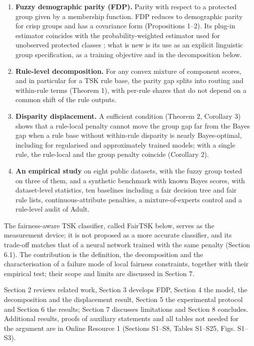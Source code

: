\documentclass[pdflatex,sn-basic,Numbered,lineno]{sn-jnl}
\providecommand{\tightlist}{\setlength{\itemsep}{0pt}\setlength{\parskip}{0pt}}
\begin{document}
\begin{enumerate}
\def\labelenumi{\arabic{enumi}.}
\tightlist
\item
  \textbf{Fuzzy demographic parity (FDP).} Parity with respect to a protected group given by a membership function. FDP reduces to demographic parity for crisp groups and has a covariance form (Propositions 1--2). Its plug-in estimator coincides with the probability-weighted estimator used for unobserved protected classes \cite{chen2019,kallus2022}; what is new is its use as an explicit linguistic group specification, as a training objective and in the decomposition below.
\item
  \textbf{Rule-level decomposition.} For any convex mixture of component scores, and in particular for a TSK rule base, the parity gap splits into routing and within-rule terms (Theorem 1), with per-rule shares that do not depend on a common shift of the rule outputs.
\item
  \textbf{Disparity displacement.} A sufficient condition (Theorem 2, Corollary 3) shows that a rule-local penalty cannot move the group gap far from the Bayes gap when a rule base without within-rule disparity is nearly Bayes-optimal, including for regularised and approximately trained models; with a single rule, the rule-local and the group penalty coincide (Corollary 2).
\item
  \textbf{An empirical study} on eight public datasets, with the fuzzy group tested on three of them, and a synthetic benchmark with known Bayes scores, with dataset-level statistics, ten baselines including a fair decision tree and fair rule lists, continuous-attribute penalties, a mixture-of-experts control and a rule-level audit of Adult.
\end{enumerate}

The fairness-aware TSK classifier, called FairTSK below, serves as the measurement device; it is not proposed as a more accurate classifier, and its trade-off matches that of a neural network trained with the same penalty (Section 6.1). The contribution is the definition, the decomposition and the characterisation of a failure mode of local fairness constraints, together with their empirical test; their scope and limits are discussed in Section 7.

Section 2 reviews related work, Section 3 develops FDP, Section 4 the model, the decomposition and the displacement result, Section 5 the experimental protocol and Section 6 the results; Section 7 discusses limitations and Section 8 concludes. Additional results, proofs of auxiliary statements and all tables not needed for the argument are in Online Resource 1 (Sections S1--S8, Tables S1--S25, Figs. S1--S3).
\end{document}
